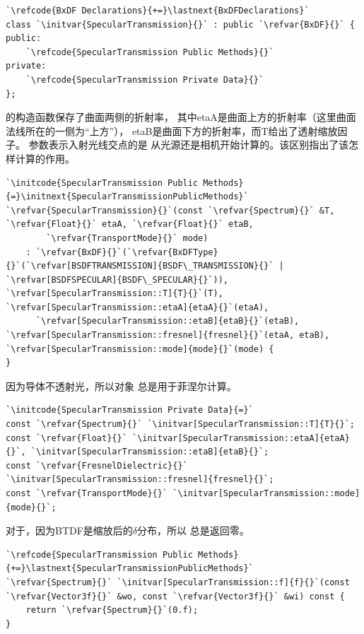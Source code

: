 \begin{lstlisting}
`\refcode{BxDF Declarations}{+=}\lastnext{BxDFDeclarations}`
class `\initvar{SpecularTransmission}{}` : public `\refvar{BxDF}{}` {
public:
    `\refcode{SpecularTransmission Public Methods}{}`
private:
    `\refcode{SpecularTransmission Private Data}{}`
};
\end{lstlisting}

的构造函数保存了曲面两侧的折射率，
其中{\ttfamily etaA}是曲面上方的折射率（这里曲面法线所在的一侧为“上方”），
{\ttfamily etaB}是曲面下方的折射率，而{\ttfamily T}给出了透射缩放因子。
参数表示入射光线交点的是
从光源还是相机开始计算的。该区别指出了该怎样计算的作用。
\begin{lstlisting}
`\initcode{SpecularTransmission Public Methods}{=}\initnext{SpecularTransmissionPublicMethods}`
`\refvar{SpecularTransmission}{}`(const `\refvar{Spectrum}{}` &T, `\refvar{Float}{}` etaA, `\refvar{Float}{}` etaB,
        `\refvar{TransportMode}{}` mode) 
    : `\refvar{BxDF}{}`(`\refvar{BxDFType}{}`(`\refvar[BSDFTRANSMISSION]{BSDF\_TRANSMISSION}{}` | `\refvar[BSDFSPECULAR]{BSDF\_SPECULAR}{}`)), `\refvar[SpecularTransmission::T]{T}{}`(T), `\refvar[SpecularTransmission::etaA]{etaA}{}`(etaA),
      `\refvar[SpecularTransmission::etaB]{etaB}{}`(etaB), `\refvar[SpecularTransmission::fresnel]{fresnel}{}`(etaA, etaB), `\refvar[SpecularTransmission::mode]{mode}{}`(mode) {
}
\end{lstlisting}
因为导体不透射光，所以对象
总是用于菲涅尔计算。

\begin{lstlisting}
`\initcode{SpecularTransmission Private Data}{=}`
const `\refvar{Spectrum}{}` `\initvar[SpecularTransmission::T]{T}{}`;
const `\refvar{Float}{}` `\initvar[SpecularTransmission::etaA]{etaA}{}`, `\initvar[SpecularTransmission::etaB]{etaB}{}`;
const `\refvar{FresnelDielectric}{}` `\initvar[SpecularTransmission::fresnel]{fresnel}{}`;
const `\refvar{TransportMode}{}` `\initvar[SpecularTransmission::mode]{mode}{}`;
\end{lstlisting}

对于，因为BTDF是缩放后的$\delta$分布，所以\linebreak
{}总是返回零。
\begin{lstlisting}
`\refcode{SpecularTransmission Public Methods}{+=}\lastnext{SpecularTransmissionPublicMethods}`
`\refvar{Spectrum}{}` `\initvar[SpecularTransmission::f]{f}{}`(const `\refvar{Vector3f}{}` &wo, const `\refvar{Vector3f}{}` &wi) const { 
    return `\refvar{Spectrum}{}`(0.f); 
}
\end{lstlisting}

